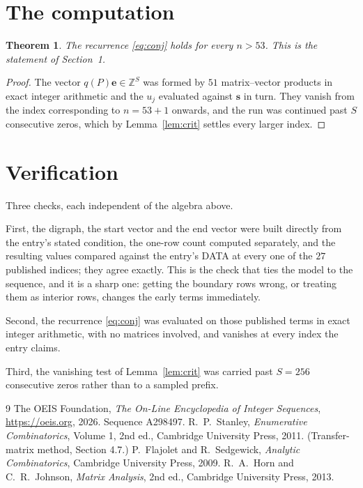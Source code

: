 \documentclass[11pt,a4paper]{article}
\theoremstyle{plain}
\newtheorem{theorem}{Theorem}
\theoremstyle{definition}
\begin{document}
\section{The computation}

\begin{theorem}
The recurrence \eqref{eq:conj} holds for every $n>53$. This is the statement of
Section~1.
\end{theorem}

\begin{proof}
The vector $q(P)\mathbf{e}\in\mathbb{Z}^{S}$ was formed by $51$ matrix--vector
products in exact integer arithmetic and the $u_j$ evaluated against $\mathbf{s}$ in turn.
They vanish from the index corresponding to $n=53+1$ onwards, and the run was continued
past $S$ consecutive zeros, which by Lemma~\ref{lem:crit} settles every larger index.
\end{proof}

\section{Verification}

Three checks, each independent of the algebra above.

First, the digraph, the start vector and the end vector were built directly from the
entry's stated condition, the one-row count computed separately, and the resulting values
compared against the entry's DATA at every one of the $27$ published indices; they
agree exactly. This is the check that ties the model to the sequence, and it is a sharp one:
getting the boundary rows wrong, or treating them as interior rows, changes the early terms
immediately.

Second, the recurrence \eqref{eq:conj} was evaluated on those published terms in exact
integer arithmetic, with no matrices involved, and vanishes at every index the entry claims.

Third, the vanishing test of Lemma~\ref{lem:crit} was carried past $S=256$ consecutive
zeros rather than to a sampled prefix.

\begin{thebibliography}{9}
 The OEIS Foundation, \emph{The On-Line Encyclopedia of Integer
Sequences}, \url{https://oeis.org}, 2026. Sequence A298497.
 R.~P.~Stanley, \emph{Enumerative Combinatorics}, Volume 1, 2nd ed.,
Cambridge University Press, 2011. (Transfer-matrix method, Section 4.7.)
 P.~Flajolet and R.~Sedgewick, \emph{Analytic Combinatorics}, Cambridge
University Press, 2009.
 R.~A.~Horn and C.~R.~Johnson, \emph{Matrix Analysis}, 2nd ed., Cambridge
University Press, 2013.
\end{thebibliography}
\end{document}
